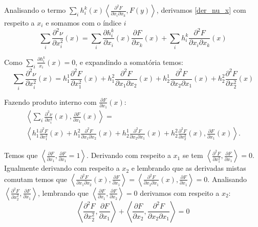 \begin{demonstracao}
	Analisando o termo $\sum_i h_i^k(x) \left\langle \frac{\partial^2 F}{\partial x_i \partial x_k}, F(y) \right\rangle$, derivamos \ref{der_nu_x} com respeito a $x_i$ e somamos com o índice $i$
	\begin{equation*}
		\sum_i \frac{\partial^2 \nu}{\partial x_i^2}(x) = \sum_i \frac{\partial h_i^k}{\partial x_i}(x) \frac{\partial F}{\partial x_k}(x) + \sum_i h_i^k \frac{\partial^2 F}{\partial x_i \partial x_k}(x)
	\end{equation*}
	
	Como $\sum_i \frac{\partial h_i^k}{x_i}(x) = 0$, e expandindo a somatória  temos:
	\begin{equation*}
		\sum_i \frac{\partial^2 \nu}{\partial x_i^2}(x) =  h_1^1 \frac{\partial^2 F}{\partial x_1^2}(x) + h_1^2 \frac{\partial^2 F}{\partial x_1 \partial x_2}(x) + h_2^1 \frac{\partial^2 F}{\partial x_2 \partial x_1}(x) + h_2^2 \frac{\partial^2 F}{\partial x_2^2}(x)
	\end{equation*}
	
	Fazendo produto interno com $\frac{\partial F}{\partial x_1}(x)$:
	\begin{multline*}
		\left\langle \sum_i \frac{\partial^2 \nu}{\partial x_i^2}(x), \frac{\partial F}{\partial x_1}(x) \right\rangle =\\
		\left\langle h_1^1 \frac{\partial^2 F}{\partial x_1^2}(x) + h_1^2 \frac{\partial^2 F}{\partial x_1 \partial x_2}(x) + h_2^1 \frac{\partial^2 F}{\partial x_2 \partial x_1}(x) + h_2^2 \frac{\partial^2 F}{\partial x_2^2}(x), \frac{\partial F}{\partial x_1}(x) \right\rangle.
	\end{multline*}
	
	Temos que $\left\langle \frac{\partial F}{\partial x_1}, \frac{\partial F}{\partial x_1} = 1 \right\rangle$. Derivando com respeito a $x_1$ se tem $\left\langle \frac{\partial^2 F}{\partial x_1^2}, \frac{\partial F}{\partial x_1} \right\rangle = 0$. Igualmente derivando com respeito a $x_2$ e lembrando que as derivadas mistas comutam temos que $\left\langle \frac{\partial^2 F}{\partial x_1 \partial x_2}(x), \frac{\partial F}{\partial x_1} \right\rangle = \left\langle \frac{\partial^2 F}{\partial x_2 \partial x_1}(x), \frac{\partial F}{\partial x_1} \right\rangle = 0$. Analisando $\left\langle \frac{\partial^2 F}{\partial x_2^2}, \frac{\partial F}{\partial x_1} \right\rangle$, lembrando que $\left\langle \frac{\partial F}{\partial x_1}, \frac{\partial F}{\partial x_2} \right\rangle = 0$ derivamos com respeito a $x_2$:
	\begin{equation*}
		\left\langle \frac{\partial^2 F}{\partial x_2^2}, \frac{\partial F}{\partial x_1} \right\rangle + \left\langle \frac{\partial F}{\partial x_2}, \frac{\partial^2 F}{\partial x_2 \partial x_1} \right\rangle = 0
	\end{equation*}
	

\end{demonstracao}
